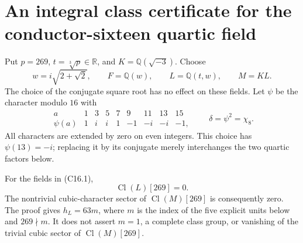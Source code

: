\section{An integral class certificate for the conductor-sixteen quartic field}
\label{sec:cubic-conductor16-class-certificate}

Put $p=269$, $t=\sqrt[3]{p}\in\mathbb R$, and
$K=\mathbb Q(\sqrt{-3})$.  Choose
\[
 w=i\sqrt{2+\sqrt2},\qquad F=\mathbb Q(w),\qquad
 L=\mathbb Q(t,w),\qquad M=KL.
 \tag{C16.1}
\]
The choice of the conjugate square root has no effect on these fields.
Let $\psi$ be the character modulo $16$ with
\[
\begin{array}{c|rrrrrrrr}
a&1&3&5&7&9&11&13&15\\\hline
\psi(a)&1&i&i&1&-1&-i&-i&-1,
\end{array}
\qquad \delta=\psi^2=\chi_8.
\tag{C16.2}
\]
All characters are extended by zero on even integers.  This choice
has $\psi(13)=-i$; replacing it by its conjugate merely interchanges
the two quartic factors below.

\begin{theorem}
\label{AC-G142-class}
For the fields in (C16.1),
\[
                 \operatorname{Cl}(L)[269]=0.
 \tag{C16.3}
\]
The nontrivial cubic-character sector of
$\operatorname{Cl}(M)[269]$ is consequently zero.
The proof gives $h_L=63m$, where $m$ is the index of the five
explicit units below and $269\nmid m$.  It does not assert
$m=1$, a complete class group, or vanishing of the trivial cubic
sector of $\operatorname{Cl}(M)[269]$.
\end{theorem}

